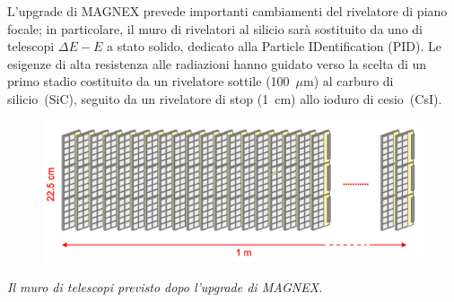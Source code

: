 \documentclass[10pt,foldmark,notumble]{leaflet}
\begin{document}
L'upgrade di MAGNEX prevede importanti cambiamenti del rivelatore di piano focale; in particolare, il muro di rivelatori al silicio sarà sostituito da uno di telescopi $\Delta E - E$ a stato solido, dedicato alla Particle IDentification (PID). 
Le esigenze di alta resistenza alle radiazioni hanno guidato verso la scelta di un primo stadio costituito da un rivelatore sottile (100~$\mu$m) al carburo di silicio~(SiC), seguito da un rivelatore di stop (1~cm) allo ioduro di cesio~(CsI).

\begin{figure} [!h]
	\centering
	\includegraphics[width=0.88\columnwidth, keepaspectratio]{Grafici/muro_telescopi.png}
\end{figure}
\hspace{0.2 cm}\textit{Il muro di telescopi previsto dopo l'upgrade di MAGNEX.}
\end{document}
